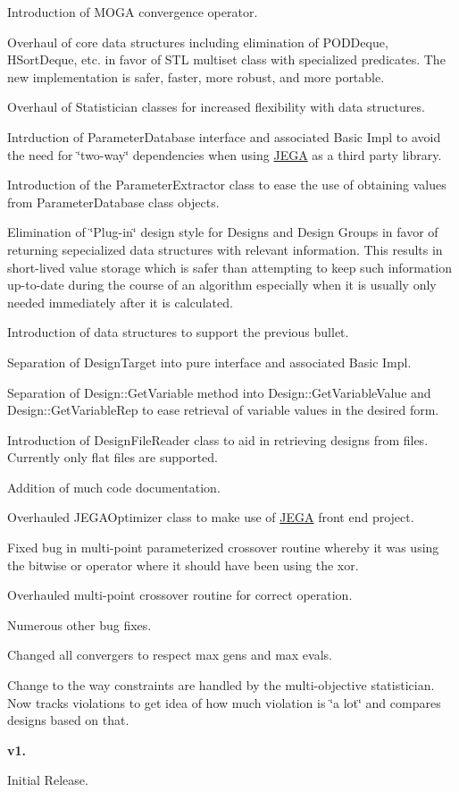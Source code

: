 \begin{DoxyItemize}
\item Introduction of M\+O\+GA convergence operator.
\item Overhaul of core data structures including elimination of P\+O\+D\+Deque, H\+Sort\+Deque, etc. in favor of S\+TL multiset class with specialized predicates. The new implementation is safer, faster, more robust, and more portable.
\item Overhaul of Statistician classes for increased flexibility with data structures.
\item Intrduction of Parameter\+Database interface and associated Basic Impl to avoid the need for \char`\"{}two-\/way\char`\"{} dependencies when using \hyperlink{namespaceJEGA}{J\+E\+GA} as a third party library.
\item Introduction of the Parameter\+Extractor class to ease the use of obtaining values from Parameter\+Database class objects.
\item Elimination of \char`\"{}\+Plug-\/in\char`\"{} design style for Designs and Design Groups in favor of returning sepecialized data structures with relevant information. This results in short-\/lived value storage which is safer than attempting to keep such information up-\/to-\/date during the course of an algorithm especially when it is usually only needed immediately after it is calculated.
\item Introduction of data structures to support the previous bullet.
\item Separation of Design\+Target into pure interface and associated Basic Impl.
\item Separation of Design\+::\+Get\+Variable method into Design\+::\+Get\+Variable\+Value and Design\+::\+Get\+Variable\+Rep to ease retrieval of variable values in the desired form.
\item Introduction of Design\+File\+Reader class to aid in retrieving designs from files. Currently only flat files are supported.
\item Addition of much code documentation.
\item Overhauled J\+E\+G\+A\+Optimizer class to make use of \hyperlink{namespaceJEGA}{J\+E\+GA} front end project.
\item Fixed bug in multi-\/point parameterized crossover routine whereby it was using the bitwise or operator where it should have been using the xor.
\item Overhauled multi-\/point crossover routine for correct operation.
\item Numerous other bug fixes.
\item Changed all convergers to respect max gens and max evals.
\item Change to the way constraints are handled by the multi-\/objective statistician. Now tracks violations to get idea of how much violation is \char`\"{}a lot\char`\"{} and compares designs based on that.
\end{DoxyItemize}

{\bfseries v1.}


\begin{DoxyItemize}
\item Initial Release. 
\end{DoxyItemize}